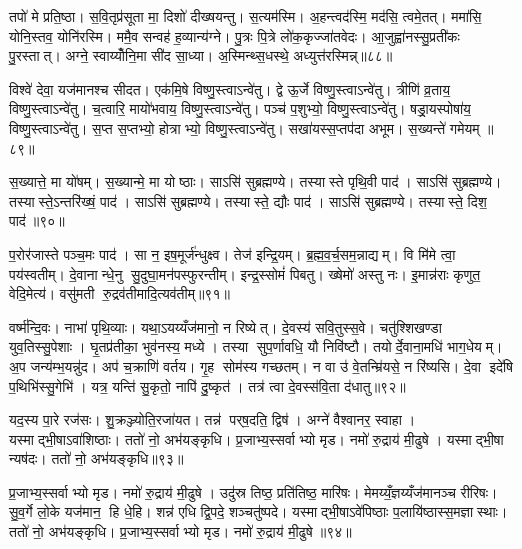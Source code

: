 तपो॑ मे प्रति॒ष्ठा। स॒वि॒तृप्र॑सूता मा॒ दिशो॑ दीख्षयन्तु। स॒त्यम॑स्मि। अ॒हन्त्वद॑स्मि॒ मद॑सि॒ त्वमे॒तत्। ममा॑सि॒ योनि॒स्तव॒ योनि॑रस्मि। ममै॒व सन्वह॑ ह॒व्यान्य॑ग्ने। पु॒त्रः पि॒त्रे लो॑क॒कृज्जा॑तवेदः। आ॒जुह्वा॑नस्सु॒प्रती॑कः पु॒रस्तात्। अग्ने॒ स्वाय्योँनि॒मा सी॑द सा॒ध्या। अ॒स्मिन्थ्स॒धस्थे॒ अध्युत्त॑रस्मिन्न्॥८८॥

विश्वे॑ देवा॒ यज॑मानश्च सीदत। एक॑मि॒षे विष्णु॒स्त्वाऽन्वे॑तु। द्वे ऊ॒र्जे विष्णु॒स्त्वाऽन्वे॑तु। त्रीणि॑ व्र॒ताय॒ विष्णु॒स्त्वाऽन्वे॑तु। च॒त्वारि॒ मायो॑भवाय॒ विष्णु॒स्त्वाऽन्वे॑तु। पञ्च॑ प॒शुभ्यो॒ विष्णु॒स्त्वाऽन्वे॑तु। षड्रा॒यस्पोषा॑य॒ विष्णु॒स्त्वाऽन्वे॑तु। स॒प्त स॒प्तभ्यो॒ होत्राभ्यो॒ विष्णु॒स्त्वाऽन्वे॑तु। सखा॑यस्स॒प्तप॑दा अभूम। स॒ख्यन्ते॑ गमेयम् ॥८९॥

स॒ख्यात्ते॒ मा यो॑षम्। स॒ख्यान्मे॒ मा योष्ठाः। साऽसि॑ सुब्रह्मण्ये। तस्यास्ते पृथि॒वी पाद॑। साऽसि॑ सुब्रह्मण्ये। तस्यास्ते॒ऽन्तरि॑ख्षं॒ पाद॑। साऽसि॑ सुब्रह्मण्ये। तस्यास्ते॒ द्यौः पाद॑। साऽसि॑ सुब्रह्मण्ये। तस्यास्ते॒ दिश॒ पाद॑॥९०॥

प॒रोर॑जास्ते पञ्च॒मः पाद॑। सा न॒ इष॒मूर्ज॑न्धुक्ष्व। तेज॑ इन्द्रि॒यम्। ब्र॒ह्म॒व॒र्च॒सम॒न्नाद्यम्। वि मि॑मे त्वा॒ पय॑स्वतीम्। दे॒वानान्धे॒नु सु॒दुघा॒मन॑पस्फुरन्तीम्। इन्द्र॒स्सोमं॑ पिबतु। ख्षेमो॑ अस्तु नः। इ॒मान्न॑राः कृणुत॒ वेदि॒मेत्य॑। वसु॑मती रु॒द्रव॑तीमादि॒त्यव॑तीम्॥९१॥

वर्ष्म॑न्दि॒वः। नाभा॑ पृथि॒व्याः। यथा॒ऽयय्यँज॑मानो॒ न रिष्येत्। दे॒वस्य॑ सवि॒तुस्स॒वे। चतु॑श्शिखण्डा युव॒तिस्सु॒पेशाः। घृ॒तप्र॑तीका॒ भुव॑नस्य॒ मध्ये। तस्या सुप॒र्णावधि॒ यौ निवि॑ष्टौ। तयोर्दे॒वाना॒मधि॑ भाग॒धेयम्। अ॒प जन्य॑म्भ॒यन्नु॑द। अप॑ च॒क्राणि॑ वर्तय। गृ॒ह सोम॑स्य गच्छतम्। न वा उ॑ वे॒तन्म्रि॑यसे॒ न रि॑ष्यसि। दे॒वा इदे॑षि प॒थिभि॑स्सु॒गेभि॑। यत्र॒ यन्ति॑ सु॒कृतो॒ नापि॑ दु॒ष्कृत॑। तत्र॑ त्वा दे॒वस्स॑वि॒ता द॑धातु॥९२॥\anuvakamend[ब्रह्म॑णो॒ योनि॒रह॑सः प॒ङ्क्तिं प्रप॑द्ये दी॒ख्षा यया॑ऽऽदि॒त्यो दी॒ख्षया॑ दीख्षि॒तस्तया त्वा दी॒ख्षया॑ दीख्षया॒म्योष॑धयो दी॒ख्षा द्यौस्त्वा॒ दीख्ष॑माण॒मनु॑ दीख्षता॒मप॑चिति॒श्चाख्षि॑ति॒रुत्त॑रस्मिन्गमेय॒न्दिश॒ पाद॑ आदि॒त्यव॑तीव्वँर्तय॒ पञ्च॑ च]

यद॒स्य पा॒रे रज॑सः। शु॒क्रञ्ज्योति॒रजा॑यत। तन्न॑ पर्‌ष॒दति॒ द्विष॑। अग्ने॑ वैश्वानर॒ स्वाहा। यस्माद्भी॒षाऽवा॑शिष्ठाः। ततो॑ नो॒ अभ॑यङ्कृधि। प्र॒जाभ्य॒स्सर्वाभ्यो मृड। नमो॑ रु॒द्राय॑ मी॒ढुषे। यस्माद्भी॒षा न्यष॑दः। ततो॑ नो॒ अभ॑यङ्कृधि॥९३॥

प्र॒जाभ्य॒स्सर्वाभ्यो मृड। नमो॑ रु॒द्राय॑ मी॒ढुषे। उदु॑स्र तिष्ठ॒ प्रति॑तिष्ठ॒ मारि॑षः। मेमय्यँ॒ज्ञय्यँज॑मानञ्च रीरिषः। सु॒व॒र्गे लो॒के यज॑मान॒ हि धे॒हि। शन्न॑ एधि द्वि॒पदे॒ शञ्चतु॑ष्पदे। यस्माद्भी॒षाऽवे॑पिष्ठाः प॒लायि॑ष्ठास्स॒मज्ञास्थाः। ततो॑ नो॒ अभ॑यङ्कृधि। प्र॒जाभ्य॒स्सर्वाभ्यो मृड। नमो॑ रु॒द्राय॑ मी॒ढुषे॥९४॥

